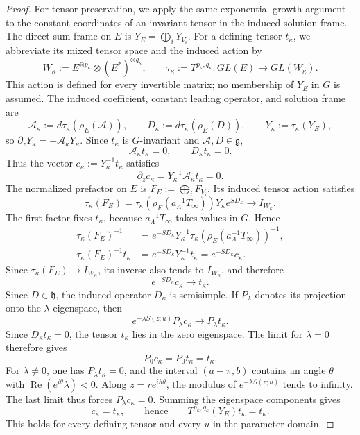 \documentclass[11pt,leqno]{amsart}
\numberwithin{equation}{section}
\theoremstyle{plain}
\theoremstyle{definition}
\theoremstyle{plain}
\theoremstyle{definition}
\theoremstyle{remark}
\newcommand{\g}{\mathfrak g}
\newcommand{\gh}{\mathfrak h}
\begin{document}
\begin{proof}
For tensor preservation, we apply the same exponential growth argument to the constant coordinates of an invariant tensor in the induced solution frame.  The direct-sum frame on $E$ is $Y_E=\bigoplus_iY_{V_i}$.  For a defining tensor $t_\kappa$, we abbreviate its mixed tensor space and the induced action by
\[
 W_\kappa:=E^{\otimes p_\kappa}\otimes(E^*)^{\otimes q_\kappa},\qquad
 \tau_\kappa:=T^{p_\kappa,q_\kappa}:GL(E)\longrightarrow GL(W_\kappa).
\]
This action is defined for every invertible matrix; no membership of $Y_E$ in $G$ is assumed.  The induced coefficient, constant leading operator, and solution frame are
\[
 \mathscr A_\kappa:=d\tau_\kappa(\rho_E(\mathscr A)),\qquad
 D_\kappa:=d\tau_\kappa(\rho_E(D)),\qquad
 Y_\kappa:=\tau_\kappa(Y_E),
\]
so $\partial_zY_\kappa=-\mathscr A_\kappa Y_\kappa$.  Since $t_\kappa$ is $G$-invariant and $\mathscr A,D\in\g$,
\[
 \mathscr A_\kappa t_\kappa=0,\qquad D_\kappa t_\kappa=0.
\]
Thus the vector $c_\kappa:=Y_\kappa^{-1}t_\kappa$ satisfies
\[
 \partial_zc_\kappa=Y_\kappa^{-1}\mathscr A_\kappa t_\kappa=0.
\]
The normalized prefactor on $E$ is $F_E:=\bigoplus_iF_{V_i}$.  Its induced tensor action satisfies
\[
 \tau_\kappa(F_E)
 =\tau_\kappa\!\left(\rho_E(a_\Lambda^{-1}T_\infty)\right)
       Y_\kappa e^{SD_\kappa}\longrightarrow I_{W_\kappa}.
\]
The first factor fixes $t_\kappa$, because $a_\Lambda^{-1}T_\infty$ takes values in $G$.  Hence
\[
 \begin{aligned}
 \tau_\kappa(F_E)^{-1}
 &=e^{-SD_\kappa}Y_\kappa^{-1}
       \tau_\kappa\!\left(\rho_E(a_\Lambda^{-1}T_\infty)\right)^{-1},\\
 \tau_\kappa(F_E)^{-1}t_\kappa
 &=e^{-SD_\kappa}Y_\kappa^{-1}t_\kappa
  =e^{-SD_\kappa}c_\kappa.
 \end{aligned}
\]
Since $\tau_\kappa(F_E)\to I_{W_\kappa}$, its inverse also tends to $I_{W_\kappa}$, and therefore
\[
 e^{-SD_\kappa}c_\kappa\longrightarrow t_\kappa.
\]
Since $D\in\gh$, the induced operator $D_\kappa$ is semisimple.  If $P_\lambda$ denotes its projection onto the $\lambda$-eigenspace, then
\[
 e^{-\lambda S(z;u)}P_\lambda c_\kappa
       \longrightarrow P_\lambda t_\kappa.
\]
Since $D_\kappa t_\kappa=0$, the tensor $t_\kappa$ lies in the zero eigenspace.  The limit for $\lambda=0$ therefore gives
\[
 P_0c_\kappa=P_0t_\kappa=t_\kappa.
\]  For $\lambda\ne0$, one has $P_\lambda t_\kappa=0$, and the interval $(a-\pi,b)$ contains an angle $\theta$ with $\operatorname{Re}(e^{i\theta}\lambda)<0$.  Along $z=re^{ih\theta}$, the modulus of $e^{-\lambda S(z;u)}$ tends to infinity.  The last limit thus forces $P_\lambda c_\kappa=0$.  Summing the eigenspace components gives
\[
 c_\kappa=t_\kappa,\qquad\text{hence}\qquad
 T^{p_\kappa,q_\kappa}(Y_E)t_\kappa=t_\kappa.
\]
This holds for every defining tensor and every $u$ in the parameter domain.
\end{proof}
\end{document}
